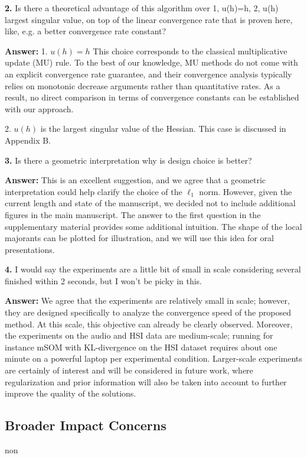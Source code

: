 \documentclass[10pt]{article} %
\newcommand{\answer}[1]{{\textbf{Answer:} \color{blue} #1}}
\begin{document}
\textbf{2.} Is there a theoretical advantage of this algorithm over 1, u(h)=h, 2, u(h) largest singular value, on top of the linear convergence rate that is proven here, like, e.g. a better convergence rate constant?

\answer{1. $u(h)=h$ This choice corresponds to the classical multiplicative update (MU) rule. To the best of our knowledge, MU methods do not come with an explicit convergence rate guarantee, and their convergence analysis typically relies on monotonic decrease arguments rather than quantitative rates. As a result, no direct comparison in terms of convergence constants can be established with our approach. 

2. $u(h) $ is the largest singular value of the Hessian. This case is discussed in Appendix B.}

\textbf{3.} Is there a geometric interpretation why is design choice is better?

\answer{This is an excellent suggestion, and we agree that a geometric interpretation could help clarify the choice of the $\ell_1$ norm. However, given the current length and state of the manuscript, we decided not to include additional figures in the main manuscript. The answer to the first question in the supplementary material provides some additional intuition. The shape of the local majorants can be plotted for illustration, and we will use this idea for oral presentations. %
}

\textbf{4.} I would say the experiments are a little bit of small in scale considering several finished within 2 seconds, but I won't be picky in this.

\answer{We agree that the experiments are relatively small in scale; however, they are designed specifically to analyze the convergence speed of the proposed method. At this scale, this objective can already be clearly observed. Moreover, the experiments on the audio and HSI data are medium-scale; running for instance mSOM with KL-divergence on the HSI dataset requires about one minute on a powerful laptop per experimental condition. Larger-scale experiments are certainly of interest and will be considered in future work, where regularization and prior information will also be taken into account to further improve the quality of the solutions.}

\subsection{Broader Impact Concerns}
non
\end{document}
